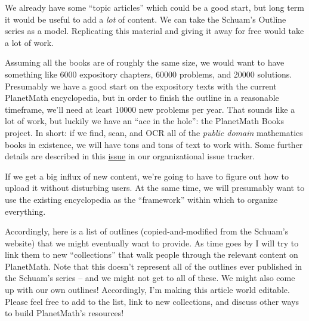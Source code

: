 \documentclass[12pt]{article}
\begin{document}
We already have some ``topic articles'' which could be a good start, but long term it would be useful to add a \emph{lot} of content.  We can take the Schuam's Outline series as a model.  Replicating this material and giving it away for free would take a lot of work.

Assuming all the books are of roughly the same size, we would want to have something like 6000 expository chapters, 60000 problems, and 20000 solutions.  Presumably we have a good start on the expository texts with the current PlanetMath encyclopedia, but in order to finish the outline in a reasonable timeframe, we'll need at least 10000 new problems per year.  That sounds like a lot of work, but luckily we have an ``ace in the hole'': the PlanetMath Books project.  In short: if we find, scan, and OCR all of the \emph{public domain} mathematics books in existence, we will have tons and tons of text to work with.  Some further details are described in this \href{https://github.com/holtzermann17/planetmath-docs/issues/37}{issue} in our organizational issue tracker.

If we get a big influx of new content, we're going to have to figure out how to upload it without disturbing users.  At the same time, we will presumably want to use the existing encyclopedia as the ``framework'' within which to organize everything.

Accordingly, here is a list of outlines (copied-and-modified from the Schuam's website) that we might eventually want to provide.  As time goes by I will try to link them to new ``collections'' that walk people through the relevant content on PlanetMath.  Note that this doesn't represent all of the outlines ever published in the Schuam's series -- and we might not get to all of these.  We might also come up with our own outlines!  Accordingly, I'm making this article world editable.  Please feel free to add to the list, link to new collections, and discuss other ways to build PlanetMath's resources!
\end{document}
